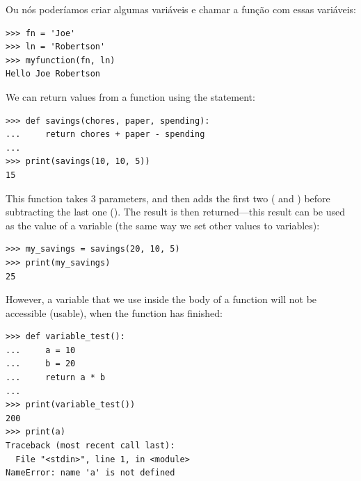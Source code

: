 \noindent
Ou nós poderíamos criar algumas variáveis e chamar a função com essas variáveis:

\begin{listing}
\begin{verbatim}
>>> fn = 'Joe'
>>> ln = 'Robertson'
>>> myfunction(fn, ln)
Hello Joe Robertson
\end{verbatim}
\end{listing}

\noindent
We can return values from a function using the  statement:

\begin{listing}
\begin{verbatim}
>>> def savings(chores, paper, spending):
...     return chores + paper - spending
...
>>> print(savings(10, 10, 5))
15
\end{verbatim}
\end{listing}

This function takes 3 parameters, and then adds the first two ( and ) before subtracting the last one ().  The result is then returned---this result can be used as the value of a variable (the same way we set other values to variables):

\begin{listing}
\begin{verbatim}
>>> my_savings = savings(20, 10, 5)
>>> print(my_savings)
25
\end{verbatim}
\end{listing}

\noindent
However, a variable that we use inside the body of a function will not be accessible (usable), when the function has finished:

\begin{listing}
\begin{verbatim}
>>> def variable_test():
...     a = 10
...     b = 20
...     return a * b
...
>>> print(variable_test())
200
>>> print(a)
Traceback (most recent call last):
  File "<stdin>", line 1, in <module>
NameError: name 'a' is not defined
\end{verbatim}
\end{listing} 

